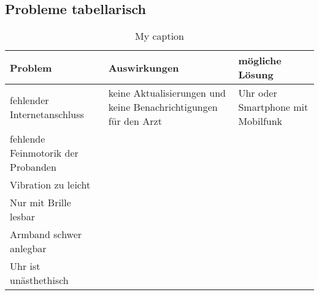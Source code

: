 \subsection{Probleme tabellarisch}
\begin{table}[]
\centering
\caption{My caption}
\label{my-label}
\begin{tabular}{|l|l|l|}
\hline
 Problem  &Auswirkungen  &mögliche Lösung  \\ \hline
 fehlender Internetanschluss  &keine Aktualisierungen und keine Benachrichtigungen für den Arzt &Uhr oder Smartphone mit Mobilfunk  \\
 fehlende Feinmotorik der Probanden&  &  \\
 Vibration zu leicht&  &  \\
 Nur mit Brille lesbar&  &  \\
 Armband schwer anlegbar&  &  \\
 Uhr ist unästhethisch&  &  \\ \hline
\end{tabular}
\end{table}
